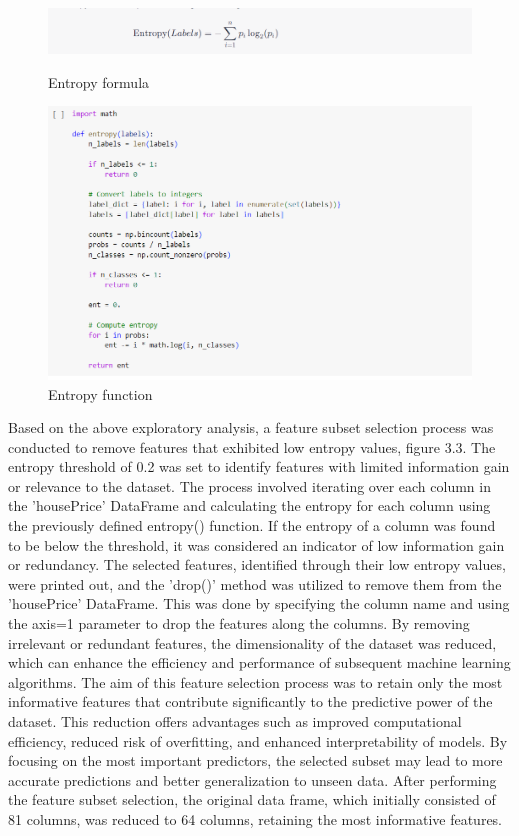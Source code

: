 \begin{figure}%
\begin{center}
    \includegraphics[scale=0.45]{imgs/entropy.png}
    \centering
    \caption{Entropy formula}
    \vspace{15pt}
    \includegraphics[scale=0.45]{imgs/entropy_function.png}
    \centering
    \caption{Entropy function}
\end{center}
\hrulefill\vspace{15pt}\par
\end{figure}

Based on the above exploratory analysis, a feature subset selection process was conducted to remove features that exhibited low entropy values, figure 3.3. The entropy threshold of 0.2 was set to identify features with limited information gain or relevance to the dataset.
The process involved iterating over each column in the 'housePrice' DataFrame and calculating the entropy for each column using the previously defined entropy() function. If the entropy of a column was found to be below the threshold, it was considered an indicator of low information gain or redundancy.
The selected features, identified through their low entropy values, were printed out, and the 'drop()' method was utilized to remove them from the 'housePrice' DataFrame. This was done by specifying the column name and using the axis=1 parameter to drop the features along the columns.
By removing irrelevant or redundant features, the dimensionality of the dataset was reduced, which can enhance the efficiency and performance of subsequent machine learning algorithms. The aim of this feature selection process was to retain only the most informative features that contribute significantly to the predictive power of the dataset.
This reduction offers advantages such as improved computational efficiency, reduced risk of overfitting, and enhanced interpretability of models. By focusing on the most important predictors, the selected subset may lead to more accurate predictions and better generalization to unseen data.
After performing the feature subset selection, the original data frame, which initially consisted of 81 columns, was reduced to 64 columns, retaining the most informative features.

